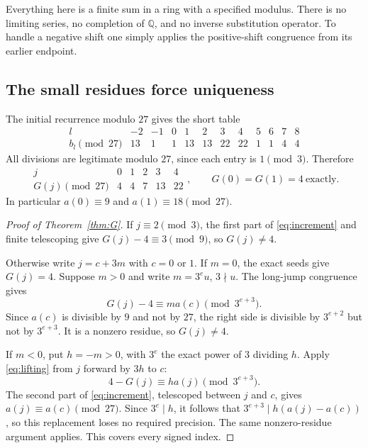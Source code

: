 \documentclass[11pt,a4paper]{article}
\theoremstyle{definition}
\newcommand{\Q}{\mathbb Q}
\begin{document}
Everything here is a finite sum in a ring with a specified modulus.
There is no limiting series, no completion of \(\Q\), and no
inverse substitution operator. To handle a negative shift one simply
applies the positive-shift congruence from its earlier endpoint.

\subsection{The small residues force uniqueness}

The initial recurrence modulo \(27\) gives the short table
\[
\begin{array}{c|rrrrrrrrrrr}
 l&-2&-1&0&1&2&3&4&5&6&7&8\\\hline
 b_l\pmod{27}&13&1&1&13&13&22&22&1&1&4&4
\end{array}
\]
All divisions are legitimate modulo \(27\), since each entry is
\(1\pmod3\). Therefore
\begin{equation}\label{eq:Gtable}
\begin{array}{c|rrrrr}
 j&0&1&2&3&4\\\hline
 G(j)\pmod{27}&4&4&7&13&22
\end{array},
 \qquad G(0)=G(1)=4\ \text{exactly}.
\end{equation}
In particular \(a(0)\equiv9\) and \(a(1)\equiv18\pmod{27}\).

\begin{proof}[Proof of Theorem~\ref{thm:G}]
If \(j\equiv2\pmod3\), the first part of
\eqref{eq:increment} and finite telescoping give
\(G(j)-4\equiv3\pmod9\), so \(G(j)\ne4\).

Otherwise write \(j=c+3m\) with \(c=0\) or \(1\).
If \(m=0\), the exact seeds give \(G(j)=4\). Suppose \(m>0\)
and write \(m=3^eu\), \(3\nmid u\). The long-jump congruence gives
\[
 G(j)-4\equiv m a(c)\pmod{3^{e+3}}.
\]
Since \(a(c)\) is divisible by \(9\) and not by \(27\), the
right side is divisible by \(3^{e+2}\) but not by \(3^{e+3}\).
It is a nonzero residue, so \(G(j)\ne4\).

If \(m<0\), put \(h=-m>0\), with \(3^e\) the exact power of
\(3\) dividing \(h\). Apply \eqref{eq:lifting} from \(j\) forward
by \(3h\) to \(c\):
\[
 4-G(j)\equiv h a(j)\pmod{3^{e+3}}.
\]
The second part of \eqref{eq:increment}, telescoped between \(j\)
and \(c\), gives \(a(j)\equiv a(c)\pmod{27}\). Since
\(3^e\mid h\), it follows that
\(3^{e+3}\mid h(a(j)-a(c))\), so this replacement loses no
required precision. The same
nonzero-residue argument applies. This covers every signed index.
\end{proof}
\end{document}
